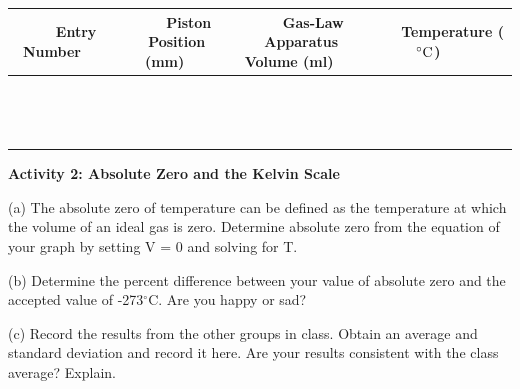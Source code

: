 \vspace{0.3cm}
{\centering \begin{tabular}{|c|c|c|c|}
\hline 
~~~Entry Number~~~&
~~~Piston Position (mm)~~~&
~~~Gas-Law Apparatus Volume (ml)~~~&
~~~Temperature ($^\circ  \rm C$)~~~\\
\hline
\hline 
&
&
&
\\
\hline 
&
&
&
\\
\hline 
&
&
&
\\
\hline 
&
&
&
\\
\hline 
&
&
&
\\
\hline 
&
&
&
\\
\hline 
&
&
&
\\
\hline 
&
&
&
\\
\hline 
&
&
&
\\
\hline
&
&
&
\\
\hline
&
&
&
\\
\hline
&
&
&
\\
\hline
&
&
&
\\
\hline
&
&
&
\\
\hline
\end{tabular}\par}
\vspace{2.0cm}

\textbf{Activity 2: Absolute Zero and the Kelvin Scale}

(a) The absolute zero of temperature can be defined as the temperature
at which the volume of an ideal gas is zero. Determine absolute
zero from the equation of your graph by setting V = 0 and solving for T.
\vspace{30mm}

(b) Determine the percent difference between your value of absolute
zero and the accepted value of -273\( ^{\circ } \)C. Are you happy or sad?
\vspace{30mm}

(c) Record the results from the other groups in class.
Obtain an average and standard deviation and record it here.
Are your results consistent with the class average? Explain.

